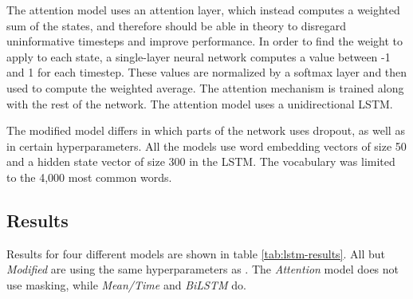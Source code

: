 
The attention model uses an attention layer, which instead computes a
weighted sum of the states, and therefore should be able in theory to
disregard uninformative timesteps and improve performance. In order to find
the weight to apply to each state, a single-layer neural network computes a
value between -1 and 1 for each timestep. These values are normalized by a
softmax layer and then used to compute the weighted average. The attention
mechanism is trained along with the rest of the network. The attention model
uses a unidirectional \ac{LSTM}.

The modified model differs in which parts of the network uses dropout, as
well as in certain hyperparameters. All the models use word embedding vectors
of size 50 and a hidden state vector of size 300 in the \ac{LSTM}. The
vocabulary was limited to the 4,000 most common words.


\subsection{Results}

Results for four different models are shown in table \ref{tab:lstm-results}. All
but \emph{Modified} are using the same hyperparameters as
\citeauthor{taghipour16}. The \emph{Attention} model does not use masking,
while \emph{Mean/Time} and \emph{BiLSTM} do.

